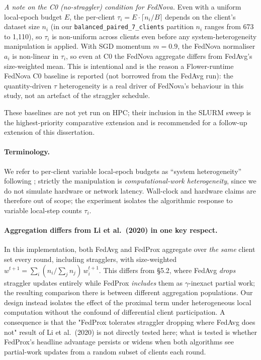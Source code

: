 \documentclass[11pt,a4paper]{article}
\begin{document}
\begin{itemize}
\emph{A note on the C0 (no-straggler) condition for FedNova.} Even with
a uniform local-epoch budget $E$, the per-client $\tau_i = E \cdot
\lceil n_i / B \rceil$ depends on the client's dataset size $n_i$ (in
our \texttt{balanced\_paired\_7\_clients} partition $n_i$ ranges from
673 to 1{,}110), so $\tau_i$ is non-uniform across clients even before
any system-heterogeneity manipulation is applied. With SGD momentum
$m = 0.9$, the FedNova normaliser $a_i$ is non-linear in $\tau_i$, so
even at C0 the FedNova aggregate differs from FedAvg's
size-weighted mean. This is intentional and is the reason a Flower-runtime
FedNova C0 baseline is reported (not borrowed from the FedAvg run): the
quantity-driven $\tau$ heterogeneity is a real driver of FedNova's
behaviour in this study, not an artefact of the straggler schedule.
\end{itemize}
These baselines are not yet run on HPC; their inclusion in the SLURM
sweep is the highest-priority comparative extension and is recommended
for a follow-up extension of this dissertation.

\paragraph{Terminology.} We refer to per-client variable local-epoch
budgets as ``system heterogeneity'' following \citet{li2020fedprox};
strictly the manipulation is \emph{computational-work heterogeneity},
since we do not simulate hardware or network latency. Wall-clock and
hardware claims are therefore out of scope; the experiment isolates
the algorithmic response to variable local-step counts $\tau_i$.

\paragraph{Aggregation differs from Li et al.\ (2020) in one key respect.}
In this implementation, both FedAvg and FedProx aggregate over
\emph{the same} client set every round, including stragglers, with size-weighted
$w^{t+1} = \sum_i (n_i / \sum_j n_j)\,w_i^{t+1}$. This differs from
\citet{li2020fedprox} §5.2, where FedAvg \emph{drops} straggler
updates entirely while FedProx \emph{includes} them as $\gamma$-inexact
partial work; the resulting comparison there is between different
aggregation populations. Our design instead isolates the effect of the
proximal term under heterogeneous local computation without the
confound of differential client participation. A consequence is that
the "FedProx tolerates straggler dropping where FedAvg does not"
result of Li et al.\ (2020) is not directly tested here; what is
tested is whether FedProx's headline advantage persists or widens when
both algorithms see partial-work updates from a random subset of
clients each round.
\end{document}
